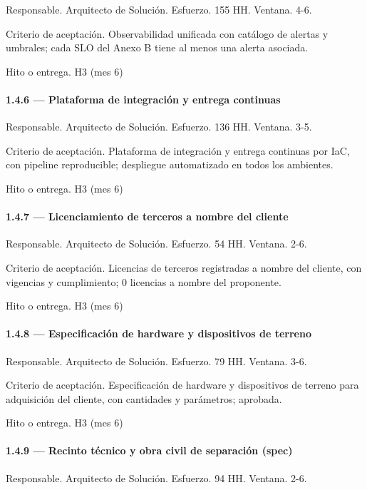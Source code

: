 \documentclass[11pt]{article}
\begin{document}
Responsable. Arquitecto de Solución. Esfuerzo. 155 HH. Ventana. 4-6.

Criterio de aceptación. Observabilidad unificada con catálogo de alertas y umbrales; cada SLO del Anexo B tiene al menos una alerta asociada.

Hito o entrega. H3 (mes 6)

\paragraph{1.4.6 — Plataforma de integración y entrega continuas}

Responsable. Arquitecto de Solución. Esfuerzo. 136 HH. Ventana. 3-5.

Criterio de aceptación. Plataforma de integración y entrega continuas por IaC, con pipeline reproducible; despliegue automatizado en todos los ambientes.

Hito o entrega. H3 (mes 6)

\paragraph{1.4.7 — Licenciamiento de terceros a nombre del cliente}

Responsable. Arquitecto de Solución. Esfuerzo. 54 HH. Ventana. 2-6.

Criterio de aceptación. Licencias de terceros registradas a nombre del cliente, con vigencias y cumplimiento; 0 licencias a nombre del proponente.

Hito o entrega. H3 (mes 6)

\paragraph{1.4.8 — Especificación de hardware y dispositivos de terreno}

Responsable. Arquitecto de Solución. Esfuerzo. 79 HH. Ventana. 3-6.

Criterio de aceptación. Especificación de hardware y dispositivos de terreno para adquisición del cliente, con cantidades y parámetros; aprobada.

Hito o entrega. H3 (mes 6)

\paragraph{1.4.9 — Recinto técnico y obra civil de separación (spec)}

Responsable. Arquitecto de Solución. Esfuerzo. 94 HH. Ventana. 2-6.
\end{document}

